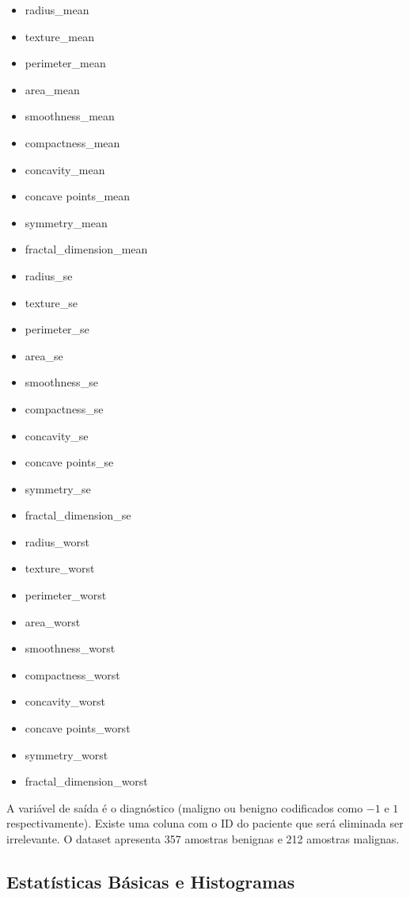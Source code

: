 \documentclass[11pt,a4paper]{article}
\numberwithin{equation}{section}
\begin{document}
\begin{multicols}{3}
\begin{itemize}
    \item radius\_mean	
    \item texture\_mean
    \item perimeter\_mean
    \item area\_mean
    \item smoothness\_mean
    \item compactness\_mean
    \item concavity\_mean
    \item concave points\_mean
    \item symmetry\_mean
    \item fractal\_dimension\_mean
    \item radius\_se
    \item texture\_se
    \item perimeter\_se
    \item area\_se
    \item smoothness\_se
    \item compactness\_se
    \item concavity\_se
    \item concave points\_se
    \item symmetry\_se
    \item fractal\_dimension\_se
    \item radius\_worst
    \item texture\_worst
    \item perimeter\_worst
    \item area\_worst
    \item smoothness\_worst
    \item compactness\_worst
    \item concavity\_worst
    \item concave points\_worst
    \item symmetry\_worst
    \item fractal\_dimension\_worst
\end{itemize}
\end{multicols}

A variável de saída é o diagnóstico (maligno ou benigno codificados como $-1$ e $1$ respectivamente). Existe uma coluna com o ID do paciente que será eliminada ser irrelevante. O dataset apresenta 357 amostras benignas e 212 amostras malignas. 

\subsection{Estatísticas Básicas e Histogramas}
\end{document}
